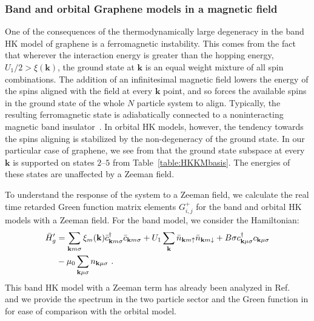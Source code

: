 \documentclass[prb,aps,amssymb,twocolumn,notitlepage]{revtex4-2}
\begin{document}
\subsubsection{Band and orbital Graphene models in a magnetic field}
One of the consequences of the thermodynamically large degeneracy in the band HK model of graphene  is a ferromagnetic instability.
This comes from the fact that wherever the interaction energy is greater than the hopping energy, $U_1/2>\xi(\mathbf{k})$, the ground state at $\mathbf{k}$ is an equal weight mixture of all spin combinations. 
The addition of an infinitesimal magnetic field lowers the energy of the spins aligned with the field at every $\mathbf{k}$ point, and so forces the available spins in the ground state of the whole $N$ particle system to align.
Typically, the resulting ferromagnetic state is adiabatically connected to a noninteracting magnetic band insulator~\cite{zhao2023failure,yang2021exactly}. 
In orbital HK models, however, the tendency towards the spins aligning is stabilized by the non-degeneracy of the ground state. 
In our particular case of graphene, we see from  that the ground state subspace at every $\mathbf{k}$ is supported on states $2$--$5$ from Table~\ref{table:HKKMbasis}. 
The energies of these states are unaffected by a Zeeman field. 

To understand the response of the system to a Zeeman field, we calculate the real time retarded Green function matrix elements $G^{+}_{i,j}$ for the band and orbital HK models with a Zeeman field. 
For the band model, we consider the Hamiltonian:
\begin{align}
\label{eq:bandgraphenezeemanH}
\Bar{H}'_{g}&=\sum_{\mathbf{k}m\sigma}\xi_m(\mathbf{k})\Bar{c}^\dagger_{\mathbf{k}m\sigma}\Bar{c}_{\mathbf{k}m\sigma}+U_{1}\sum_{\mathbf{k}}\Bar{n}_{\mathbf{k}m\uparrow}\Bar{n}_{\mathbf{k}m\downarrow}+B\sigma c^\dagger_{\mathbf{k}\mu\sigma}c_{\mathbf{k}\mu\sigma} \nonumber \\
&-\mu_{0}\sum_{\mathbf{k}\mu\sigma}n_{\mathbf{k}\mu\sigma}\text{ }.
\end{align}
This band HK model with a Zeeman term has already been analyzed in Ref.~\cite{2022PhilipSpinHallHK} and we provide the spectrum in the two particle sector and the Green function in  for ease of comparison with the orbital model.
\end{document}

